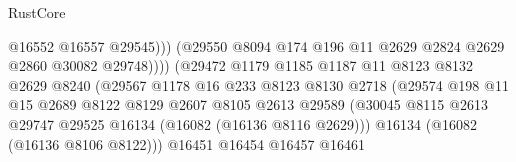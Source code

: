 \begin{lexlean}{RustCore}
\begin{coremodule}
                                                @16552
                                                @16557
                                                @29545)))
                                          (@29550
                                            @8094
                                            @174
                                            @196
                                            @11
                                            @2629
                                            @2824
                                            @2629
                                            @2860
                                            @30082
                                            @29748))))
                                    (@29472
                                      @1179
                                      @1185
                                      @1187
                                      @11
                                      @8123
                                      @8132
                                      @2629
                                      @8240
                                      (@29567
                                        @1178
                                        @16
                                        @233
                                        @8123
                                        @8130
                                        @2718
                                        (@29574
                                          @198
                                          @11
                                          @15
                                          @2689
                                          @8122
                                          @8129
                                          @2607
                                          @8105
                                          @2613
                                          @29589
                                          (@30045
                                            @8115
                                            @2613
                                            @29747
                                            @29525
                                            @16134
                                            (@16082 (@16136 @8116 @2629)))
                                          @16134
                                          (@16082 (@16136 @8106 @8122)))
                                        @16451
                                        @16454
                                        @16457
                                        @16461

\end{coremodule}
\end{lexlean}
